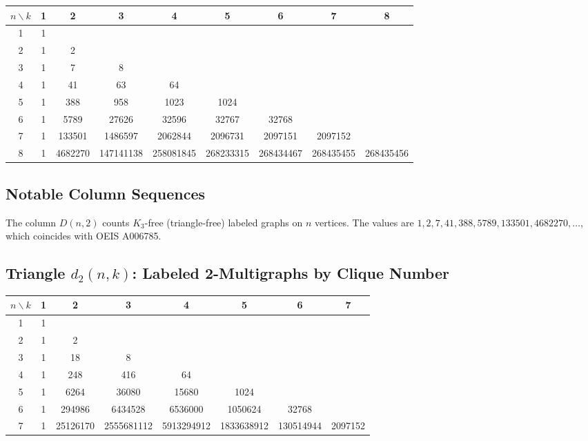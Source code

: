 \documentclass[11pt,a4paper]{article}
\theoremstyle{definition}
\begin{document}
\begin{center}
\begin{tabular}{c|cccccccc}
\toprule
$n \backslash k$ & 1 & 2 & 3 & 4 & 5 & 6 & 7 & 8 \\
\midrule
1 & 1 & & & & & & & \\
2 & 1 & 2 & & & & & & \\
3 & 1 & 7 & 8 & & & & & \\
4 & 1 & 41 & 63 & 64 & & & & \\
5 & 1 & 388 & 958 & 1023 & 1024 & & & \\
6 & 1 & 5789 & 27626 & 32596 & 32767 & 32768 & & \\
7 & 1 & 133501 & 1486597 & 2062844 & 2096731 & 2097151 & 2097152 & \\
8 & 1 & 4682270 & 147141138 & 258081845 & 268233315 & 268434467 & 268435455 & 268435456 \\
\bottomrule
\end{tabular}
\end{center}

\subsection{Notable Column Sequences}

The column $D(n, 2)$ counts $K_3$-free (triangle-free) labeled graphs on $n$ vertices. The values are $1, 2, 7, 41, 388, 5789, 133501, 4682270, \ldots$, which coincides with OEIS A006785.

\subsection{Triangle $d_2(n, k)$: Labeled 2-Multigraphs by Clique Number}

\begin{center}
\begin{tabular}{c|ccccccc}
\toprule
$n \backslash k$ & 1 & 2 & 3 & 4 & 5 & 6 & 7 \\
\midrule
1 & 1 & & & & & & \\
2 & 1 & 2 & & & & & \\
3 & 1 & 18 & 8 & & & & \\
4 & 1 & 248 & 416 & 64 & & & \\
5 & 1 & 6264 & 36080 & 15680 & 1024 & & \\
6 & 1 & 294986 & 6434528 & 6536000 & 1050624 & 32768 & \\
7 & 1 & 25126170 & 2555681112 & 5913294912 & 1833638912 & 130514944 & 2097152 \\
\bottomrule
\end{tabular}
\end{center}
\end{document}
